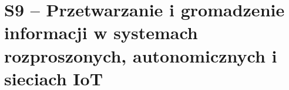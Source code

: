 \section{S9 -- Przetwarzanie i gromadzenie informacji w systemach rozproszonych, autonomicznych i sieciach IoT}